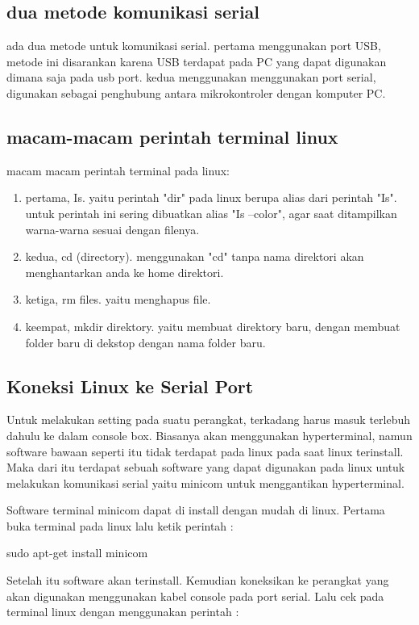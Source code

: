 	\subsection{dua metode komunikasi serial}
	ada dua metode untuk komunikasi serial.
	pertama menggunakan port USB, metode ini disarankan karena USB terdapat pada PC yang dapat digunakan dimana saja pada usb port.
	kedua menggunakan menggunakan port serial, digunakan sebagai penghubung antara mikrokontroler dengan komputer PC.
	
	\subsection{macam-macam perintah terminal linux}
	macam macam perintah terminal pada linux:
		\begin{enumerate}
			\item pertama, Is. yaitu perintah "dir" pada linux berupa alias dari perintah "Is". untuk perintah ini sering dibuatkan alias "Is --color",
				agar saat ditampilkan warna-warna sesuai dengan filenya.
			\item kedua, cd (directory). menggunakan "cd" tanpa nama direktori akan menghantarkan anda ke home direktori.
			\item ketiga, rm files. yaitu menghapus file.
			\item keempat, mkdir direktory. yaitu membuat direktory baru, dengan membuat folder baru di dekstop dengan nama folder baru.
		\end{enumerate}
	
	\subsection{Koneksi Linux ke Serial Port}
	Untuk melakukan setting pada suatu perangkat, terkadang harus masuk terlebuh dahulu ke dalam console box. Biasanya akan menggunakan hyperterminal, namun software bawaan seperti itu tidak terdapat pada linux pada saat linux terinstall. Maka dari itu terdapat sebuah software yang dapat digunakan pada linux untuk melakukan komunikasi serial yaitu minicom untuk menggantikan hyperterminal.
	
	Software terminal minicom dapat di install dengan mudah di linux. Pertama buka terminal pada linux lalu ketik perintah :

	sudo apt-get install minicom

	Setelah itu software akan terinstall. Kemudian koneksikan ke perangkat yang akan digunakan menggunakan kabel console pada port serial. Lalu cek pada terminal linux dengan menggunakan perintah :

